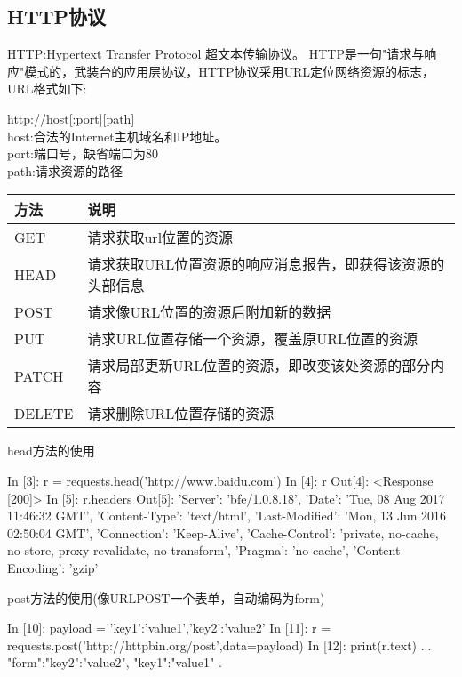 \subsection{HTTP协议}
HTTP:Hypertext Transfer Protocol 超文本传输协议。\newline
HTTP是一句"请求与响应"模式的，武装台的应用层协议，HTTP协议采用URL定位网络资源的标志，URL格式如下:\newline
\begin{center}
http://host[:port][path]\\
host:合法的Internet主机域名和IP地址。\\
port:端口号，缺省端口为80\\
path:请求资源的路径\\
\end{center}
\begin{center}
\begin{tabular}{|p{3cm}|p{12cm}|}
\hline
方法&说明\\
\hline
GET&请求获取url位置的资源\\
\hline
HEAD&请求获取URL位置资源的响应消息报告，即获得该资源的头部信息\\
\hline
POST&请求像URL位置的资源后附加新的数据\\
\hline
PUT&请求URL位置存储一个资源，覆盖原URL位置的资源\\
\hline
PATCH&请求局部更新URL位置的资源，即改变该处资源的部分内容\\
\hline
DELETE&请求删除URL位置存储的资源\\
\hline
\end{tabular}
\end{center}
head方法的使用
\begin{python}
In [3]: r = requests.head('http://www.baidu.com')
In [4]: r
Out[4]: <Response [200]>
In [5]: r.headers
Out[5]: {'Server': 'bfe/1.0.8.18', 'Date': 'Tue, 08 Aug 2017 11:46:32 GMT', 'Content-Type': 'text/html', 'Last-Modified': 'Mon, 13 Jun 2016 02:50:04 GMT', 'Connection': 'Keep-Alive', 'Cache-Control': 'private, no-cache, no-store, proxy-revalidate, no-transform', 'Pragma': 'no-cache', 'Content-Encoding': 'gzip'}
\end{python}
post方法的使用(像URLPOST一个表单，自动编码为form)
\begin{python}
In [10]: payload = {'key1':'value1','key2':'value2'}
In [11]: r = requests.post('http://httpbin.org/post',data=payload)
In [12]: print(r.text)
{...
 "form":{"key2":"value2",
         "key1":"value1"
 }.
}
\end{python}
